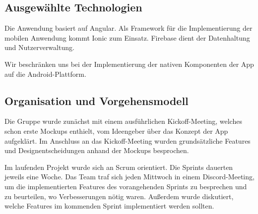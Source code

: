 \subsection{Ausgewählte Technologien}

Die Anwendung basiert auf Angular.
Als Framework für die Implementierung der mobilen Anwendung kommt Ionic zum Einsatz.
Firebase dient der Datenhaltung und Nutzerverwaltung.

Wir beschränken uns bei der Implementierung der nativen Komponenten der App auf die Android-Plattform.

\pagebreak

\subsection{Organisation und Vorgehensmodell}

Die Gruppe wurde zunächst mit einem ausführlichen Kickoff-Meeting, welches schon erste Mockups enthielt, vom Ideengeber über das Konzept der App aufgeklärt.
Im Anschluss an das Kickoff-Meeting wurden grundsätzliche Features und Designentscheidungen anhand der Mockups besprochen.

Im laufenden Projekt wurde sich an Scrum orientiert.
Die Sprints dauerten jeweils eine Woche.
Das Team traf sich jeden Mittwoch in einem Discord-Meeting, um die implementierten Features des vorangehenden Sprints zu besprechen und zu beurteilen, wo Verbesserungen nötig waren.
Außerdem wurde diskutiert, welche Features im kommenden Sprint implementiert werden sollten.
